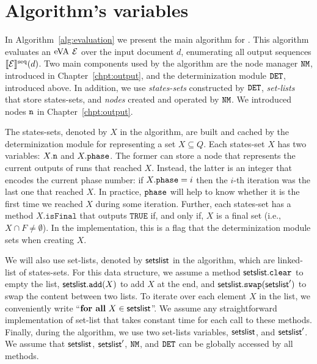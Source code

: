 \section{Algorithm's variables} 
In Algorithm~\ref{alg:evaluation} we present the main algorithm for \rematch. This algorithm evaluates an $\mathrm{eVA}$ $\mathcal{E}$ over the input document $d$, enumerating all output sequences $\llbracket\mathcal{E}\rrbracket^{\operatorname{seq}}(d)$. %
%
Two main components used by the algorithm are the node manager $\mathtt{NM}$, introduced in Chapter~\ref{chpt:output}, and the determinization module $\mathtt{DET}$, introduced above. In addition, we use \emph{states-sets} constructed by $\mathtt{DET}$, \emph{set-lists} that store states-sets, and \emph{nodes} created and operated by $\mathtt{NM}$. We introduced nodes $\mathtt{n}$ in Chapter~\ref{chpt:output}. %

The states-sets, denoted by $X$ in the algorithm, are built and cached by the determinization module for representing a set $X \subseteq Q$. Each states-set $X$ has two variables: $X.\mathtt{n}$ and $X.\texttt{phase}$. The former can store a node that represents the current outputs of runs that reached $X$. Instead, the latter is an integer that encodes the current phase number: if $X.\texttt{phase} = i$ then the $i$-th iteration was the last one that reached $X$. In practice, $\texttt{phase}$ will help to know whether it is the first time we reached $X$ during some iteration. Further, each states-set has a method $X.\texttt{isFinal}$ that outputs $\texttt{TRUE}$ if, and only if, $X$ is a final set (i.e., $X \cap F \neq \emptyset$). In the implementation, this is a flag that the determinization module sets when creating $X$.

We will also use set-lists, denoted by $\textsf{setslist}$ in the algorithm, which are linked-list of states-sets. For this data structure, we assume a method $\textsf{setslist}.\texttt{clear}$ to empty the list, $\textsf{setslist}.\texttt{add}(X)$ to add $X$ at the end, and $\textsf{setslist}.\texttt{swap}(\textsf{setslist}')$ to swap the content between two lists. To iterate over each element $X$ in the list, we conveniently write ``$\textbf{for all} \ X \in \textsf{setslist}$''. We assume any straightforward implementation of set-list that takes constant time for each call to these methods. Finally, during the algorithm, we use two set-lists variables, $\textsf{setslist}$, and $\textsf{setslist}'$. We assume that $\textsf{setslist}$, $\textsf{setslist}'$, $\mathtt{NM}$, and $\mathtt{DET}$ can be globally accessed by all methods.

